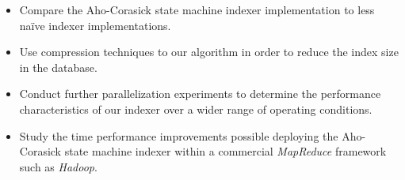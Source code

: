 \documentclass[10pt]{article}
\begin{document}
\begin{itemize}
  \item Compare the Aho-Corasick state machine indexer implementation
    to less na\"{i}ve indexer implementations.
    
    \item Use compression techniques to our algorithm in order to
      reduce the index size in the database.

      \item Conduct further parallelization experiments to determine
        the performance characteristics of our indexer over a wider
        range of operating conditions.

    \item Study the time performance improvements possible deploying
      the Aho-Corasick state machine indexer within a commercial
      \textit{MapReduce} framework such as \textit{Hadoop}.
\end{itemize}



\renewcommand\bibname{References}


\end{document}
